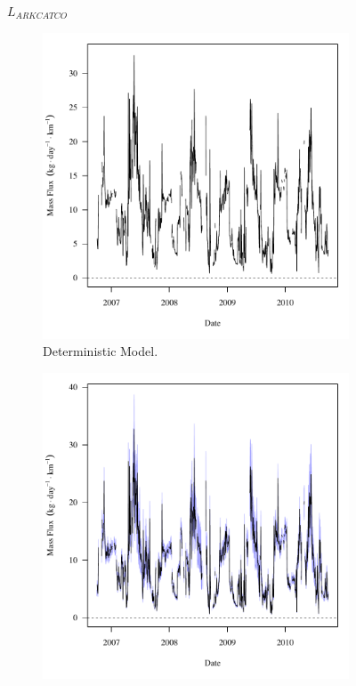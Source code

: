 \begin{linenumbers}
\subfiguretop
\begin{landscape}
	\begin{figure}
		$ \displaystyle L_{ARKCATCO} $
		\begin{subfigure}{0.7\textwidth}
			\centering
			\includegraphics[width=\tableCustomSize]{"Figures/Results_USR/Deterministic/f U163"}
			\caption{Deterministic Model.}
		\end{subfigure}%
		\begin{subfigure}{0.7\textwidth}
			\centering
			\includegraphics[width=\tableCustomSize]{"Figures/Results_USR/Stochastic/f U163"}

\end{subfigure}
\end{figure}
\end{landscape}
\end{linenumbers}
